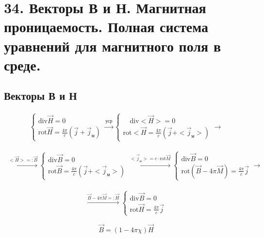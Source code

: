 \section*{34. Векторы В и Н. Магнитная проницаемость. Полная система уравнений для
магнитного поля в среде.}

\subsection*{Векторы В и Н}

\[
\begin{aligned}
    \begin{cases}
        \mathrm{div}\vec{H}=0  \\ 
        \mathrm{rot}\vec{H}=\frac{4\pi}{c}(\vec{j}+\vec{j}_{\text{м}})
    \end{cases}
    \overset{\text{уср}}{\rightarrow}
    \begin{cases}
        \quad \mathrm{div}<\vec{H}>=0 \\
        \mathrm{rot}<\vec{H}= \frac{4\pi}{c}(\vec{j}+<\vec{j}_{\text{м}}>)
    \end{cases}
    \rightarrow
\end{aligned}
\]

\[
\begin{aligned}
    \overset{<\vec{H}>=:\vec{B}}{\rightarrow}
    \begin{cases}
        \mathrm{div}\vec{B}=0 \\
        \mathrm{rot}\vec{B}= \frac{4\pi}{c}(\vec{j}+<\vec{j}_{\text{м}}>)
    \end{cases}
    \overset{<\vec{j}_{\text{м}}>=c\cdot \mathrm{rot}\vec{M}}{\rightarrow}
    \begin{cases}
        \mathrm{div}\vec{B}=0 \\
        \mathrm{rot}(\vec{B}-4\pi\vec{M})= \frac{4\pi}{c}\vec{j}
    \end{cases}
    \rightarrow 
\end{aligned}
\]

\[
\begin{aligned}
    \overset{\vec{B}-4\pi\vec{M}=:\vec{H}}{\rightarrow}
    \boxed{\begin{cases}
        \mathrm{div}\vec{B}=0 \\
        \mathrm{rot}\vec{H}= \frac{4\pi}{c}\vec{j}
    \end{cases}
    }
\end{aligned}
\]

\[
\vec{B}=(1-4\pi\chi)\vec{H}
\]

